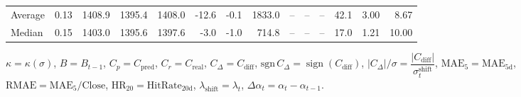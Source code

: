 \begin{threeparttable}
{\begin{tabular}{lrrrrrrrrrrrrr}
Average &     0.13 & 1408.9 & 1395.4 & 1408.0 &      -12.6 &                     -0.1 &              1833.0 &         -- &        -- &             -- &             42.1 &            3.00 &                   8.67 \\
 Median &     0.15 & 1403.0 & 1395.6 & 1397.6 &       -3.0 &                     -1.0 &               714.8 &         -- &        -- &             -- &             17.0 &            1.21 &                  10.00 \\
\bottomrule
\end{tabular}
}
\begin{tablenotes}\footnotesize
\item $\kappa=\kappa(\sigma)$, $B=B_{t-1}$, $C_p=C_{\text{pred}}$, $C_r=C_{\text{real}}$, $C_\Delta=C_{\text{diff}}$, $\mathrm{sgn}\,C_\Delta=\operatorname{sign}(C_{\text{diff}})$, $|C_\Delta|/\sigma=\dfrac{|C_{\text{diff}}|}{\sigma_t^{\text{shift}}}$, $\mathrm{MAE}_5=\mathrm{MAE}_{5\text{d}}$, $\mathrm{RMAE}= \mathrm{MAE}_5 / \text{Close}$, $\mathrm{HR}_{20}=\mathrm{HitRate}_{20\text{d}}$, 
$\lambda_{\text{shift}}=\lambda_t$, 
$\Delta\alpha_t=\alpha_t-\alpha_{t-1}$.
\end{tablenotes}
\end{threeparttable}
\endgroup
